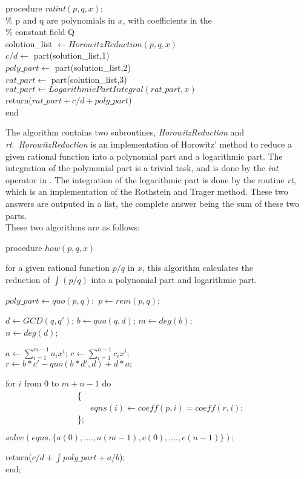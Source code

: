 \begin{flushleft}
procedure \textit{ratint}$(p,q,x);$ \\
\% p and q are polynomials in $x$, with coefficients in the \\
\% constant field Q \\
solution\_list $\leftarrow HorowitzReduction(p,q,x)$ \\
$c/d \leftarrow$ part(solution\_list,1) \\
$poly\_part \leftarrow$ part(solution\_list,2) \\
$rat\_part \leftarrow$ part(solution\_list,3) \\
$rat\_part \leftarrow LogarithmicPartIntegral(rat\_part,x)$ \\
return($rat\_part+c/d+poly\_part$) \\
end
\end{flushleft}

The algorithm contains two subroutines, \emph{HorowitzReduction} and \emph{rt}.\ \emph{HorowitzReduction} is an implementation of Horowitz' method to reduce a given rational function into a polynomial part and a logarithmic part. The integration of the polynomial part is a trivial task, and is done by the \emph{int} operator in \REDUCE. The integration of the logarithmic part is done by the routine \emph{rt}, which is an implementation of the Rothstein and Trager method. These two answers are outputed in a list, the complete answer being the sum of these two parts.
\\
These two algorithms are as follows:

\begin{flushleft}
procedure $how(p,q,x)$

for a given rational function $p/q$ in $x$, this algorithm calculates the \\
reduction of $\int(p/q)$ into a polynomial part and logarithmic part.

$poly\_part \leftarrow quo(p,q);$ \hspace{3mm} $p \leftarrow rem(p,q)$;

$d \leftarrow GCD(q,q')$; \hspace{3mm} $b \leftarrow quo(q,d)$; \hspace{3mm}
$m \leftarrow deg(b)$; \\
$n \leftarrow deg(d)$;

$a \leftarrow \sum_{i=1}^{m-1} a_{i}x^{i}$; \hspace{3mm}
   $c \leftarrow \sum_{i=1}^{n-1} c_{i}x^{i}$; \\

$r \leftarrow b*c'-quo(b*d',d)+d*a;$

for $i$ from $0$ to $m+n-1$ do \\
~~~~~~~~~~~~~~~~~\{ \\
~~~~~~~~~~~~~~~~~~~~$eqns(i) \leftarrow coeff(p,i)=coeff(r,i)$; \\
~~~~~~~~~~~~~~~~~\};

$solve(eqns,\{a(0),....,a(m-1),c(0),....,c(n-1)\});$

return($c/d+\int poly\_part + a/b$); \\
end;
\end{flushleft}

